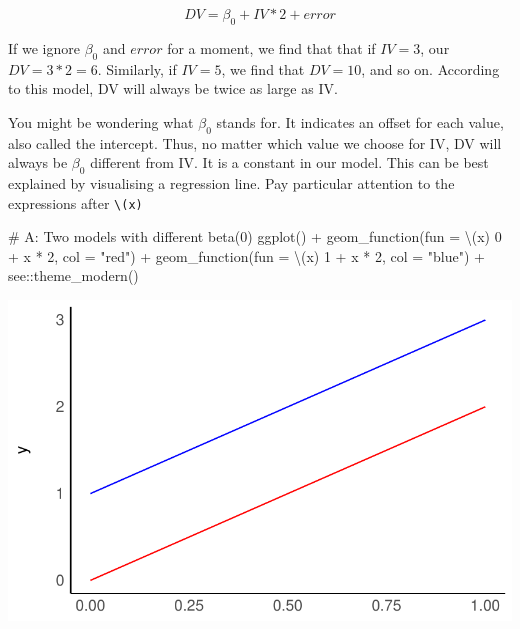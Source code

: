 \documentclass[
  letterpaper,
]{krantz}
\makeatletter
\newenvironment{Shaded}{\begin{snugshade}}{\end{snugshade}}
\newcommand{\AttributeTok}[1]{\textcolor[rgb]{0.40,0.45,0.13}{#1}}
\newcommand{\CommentTok}[1]{\textcolor[rgb]{0.37,0.37,0.37}{#1}}
\newcommand{\DecValTok}[1]{\textcolor[rgb]{0.68,0.00,0.00}{#1}}
\newcommand{\FunctionTok}[1]{\textcolor[rgb]{0.28,0.35,0.67}{#1}}
\newcommand{\NormalTok}[1]{\textcolor[rgb]{0.00,0.23,0.31}{#1}}
\newcommand{\SpecialCharTok}[1]{\textcolor[rgb]{0.37,0.37,0.37}{#1}}
\newcommand{\StringTok}[1]{\textcolor[rgb]{0.13,0.47,0.30}{#1}}
\newenvironment{kframe}{%
\medskip{}
\setlength{\fboxsep}{.8em}
 \def\at@end@of@kframe{}%
 \ifinner\ifhmode%
  \def\at@end@of@kframe{\end{minipage}}%
  \begin{minipage}{\columnwidth}%
 \fi\fi%
 \def\FrameCommand##1{\hskip\@totalleftmargin \hskip-\fboxsep
 \colorbox{shadecolor}{##1}\hskip-\fboxsep
     \hskip-\linewidth \hskip-\@totalleftmargin \hskip\columnwidth}%
 \MakeFramed {\advance\hsize-\width
   \@totalleftmargin\z@ \linewidth\hsize
   \@setminipage}}%
 {\par\unskip\endMakeFramed%
 \at@end@of@kframe}
\renewenvironment{Shaded}{\begin{kframe}}{\end{kframe}}
\makeatother
\begin{document}
\label{single-linear-regression-example}
\[
DV = \beta_0 + IV * 2 + error
\]

If we ignore \(\beta_0\) and \(error\) for a moment, we find that that
if \(IV = 3\), our \(DV = 3*2 = 6\). Similarly, if \(IV = 5\), we find
that \(DV = 10\), and so on. According to this model, DV will always be
twice as large as IV.

You might be wondering what \(\beta_0\) stands for. It indicates an
offset for each value, also called the intercept. Thus, no matter which
value we choose for IV, DV will always be \(\beta_0\) different from IV.
It is a constant in our model. This can be best explained by visualising
a regression line. Pay particular attention to the expressions after
\texttt{\textbackslash{}(x)}

\begin{Shaded}
\begin{Highlighting}[]
\CommentTok{\# A: Two models with different beta(0)}
\FunctionTok{ggplot}\NormalTok{() }\SpecialCharTok{+}
  \FunctionTok{geom\_function}\NormalTok{(}\AttributeTok{fun =}\NormalTok{ \textbackslash{}(x) }\DecValTok{0} \SpecialCharTok{+}\NormalTok{ x }\SpecialCharTok{*} \DecValTok{2}\NormalTok{, }\AttributeTok{col =} \StringTok{"red"}\NormalTok{) }\SpecialCharTok{+}
  \FunctionTok{geom\_function}\NormalTok{(}\AttributeTok{fun =}\NormalTok{ \textbackslash{}(x) }\DecValTok{1} \SpecialCharTok{+}\NormalTok{ x }\SpecialCharTok{*} \DecValTok{2}\NormalTok{, }\AttributeTok{col =} \StringTok{"blue"}\NormalTok{) }\SpecialCharTok{+}
\NormalTok{  see}\SpecialCharTok{::}\FunctionTok{theme\_modern}\NormalTok{()  }
\end{Highlighting}
\end{Shaded}

\includegraphics{13_regressions_files/figure-latex/beta-zero-beta-one-explained-1.pdf}
\end{document}

